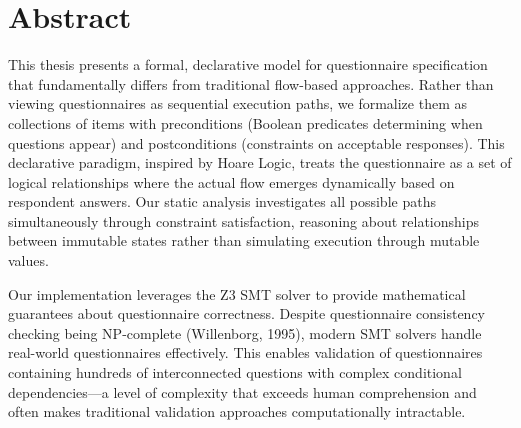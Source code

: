 \chapter*{Abstract}

This thesis presents a formal, declarative model for questionnaire specification that fundamentally differs from traditional flow-based approaches. Rather than viewing questionnaires as sequential execution paths, we formalize them as collections of items with preconditions (Boolean predicates determining when questions appear) and postconditions (constraints on acceptable responses). This declarative paradigm, inspired by Hoare Logic, treats the questionnaire as a set of logical relationships where the actual flow emerges dynamically based on respondent answers. Our static analysis investigates all possible paths simultaneously through constraint satisfaction, reasoning about relationships between immutable states rather than simulating execution through mutable values.

Our implementation leverages the Z3 SMT solver to provide mathematical guarantees about questionnaire correctness. Despite questionnaire consistency checking being NP-complete (Willenborg, 1995), modern SMT solvers handle real-world questionnaires effectively. This enables validation of questionnaires containing hundreds of interconnected questions with complex conditional dependencies---a level of complexity that exceeds human comprehension and often makes traditional validation approaches computationally intractable.
